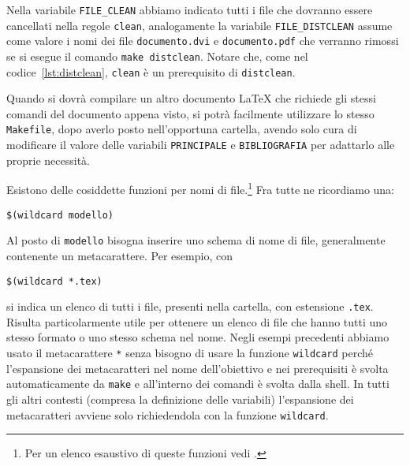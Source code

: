 Nella variabile \texttt{FILE\_CLEAN} abbiamo indicato tutti i file che dovranno
essere cancellati nella regole \texttt{clean}, analogamente la variabile
\texttt{FILE\_DISTCLEAN} assume come valore i nomi dei file
\texttt{documento.dvi} e \texttt{documento.pdf} che verranno rimossi se si
esegue il comando \texttt{make distclean}.  Notare che, come nel
codice~\ref{lst:distclean}, \texttt{clean} è un prerequisito di
\texttt{distclean}.

Quando si dovrà compilare un altro documento \LaTeX{}
che richiede gli stessi comandi del documento appena visto, si potrà facilmente
utilizzare lo stesso \texttt{Makefile}, dopo averlo posto nell'opportuna
cartella, avendo solo cura di modificare il valore delle variabili
\texttt{PRINCIPALE} e \texttt{BIBLIOGRAFIA} per adattarlo alle proprie
necessità.

Esistono delle cosiddette funzioni per nomi di
file.\footnote{Per un elenco esaustivo di queste funzioni vedi
  \textcite[83]{gnu:make}.} Fra tutte ne ricordiamo una:
\begin{lstlisting}
$(wildcard modello)
\end{lstlisting}
Al posto di \texttt{modello} bisogna inserire uno schema di nome di file,
generalmente contenente un metacarattere. Per esempio, con
\begin{lstlisting}
$(wildcard *.tex)
\end{lstlisting}
si indica un elenco di tutti i file, presenti nella cartella, con estensione
\texttt{.tex}.  Risulta particolarmente utile per ottenere un elenco di file che
hanno tutti uno stesso formato o uno stesso schema nel nome.  Negli esempi
precedenti abbiamo usato il metacarattere \texttt{*} senza bisogno di usare la
funzione \texttt{wildcard} perché l'espansione dei metacaratteri nel nome
dell'obiettivo e nei prerequisiti è svolta automaticamente da \texttt{make} e
all'interno dei comandi è svolta dalla shell.  In tutti gli altri contesti
(compresa la definizione delle variabili) l'espansione dei metacaratteri avviene
solo richiedendola con la funzione \texttt{wildcard}.

